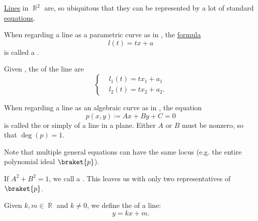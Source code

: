 \begin{definition}\label{def:plane_line_equations}
  \hyperref[def:geometric_line]{Lines} in \( \BbbR^2 \) are, so ubiquitous that they can be represented by a lot of standard \hyperref[ex:equations]{equations}.

  \begin{thmenum}
     When regarding a line as a parametric curve as in , the \hyperref[def:first_order_syntax/formula]{formula}
    \begin{equation}\label{def:plane_line_equations/parametric_equation}
      l(t) = tx + a
    \end{equation}
    is called a .

     Given , the  of the line are
    \begin{equation}\label{def:plane_line_equations/scalar_parametric_equations}
      \begin{cases}
         & l_1(t) = t x_1 + a_1  \\
         & l_2(t) = t x_2 + a_2.
      \end{cases}
    \end{equation}

     When regarding a line as an algebraic curve as in , the equation
    \begin{equation}\label{def:plane_line_equations/general_equation}
      p(x, y) \coloneqq Ax + By + C = 0
    \end{equation}
    is called the  or simply  of a line in a plane. Either \( A \) or \( B \) must be nonzero, so that \( \deg(p) = 1 \).

    Note that multiple general equations can have the same locus (e.g. the entire polynomial ideal \( \braket{p} \)).

     If \( A^2 + B^2 = 1 \), we call  a . This leaves us with only two representatives of \( \braket{p} \).

     Given \( k, m \in \BbbR \) and  \( k \neq 0 \), we define the  of a line:
    \begin{equation}\label{def:plane_line_equations/cartesian_equation}
      y = kx + m.
    \end{equation}


\end{thmenum}
\end{definition}
